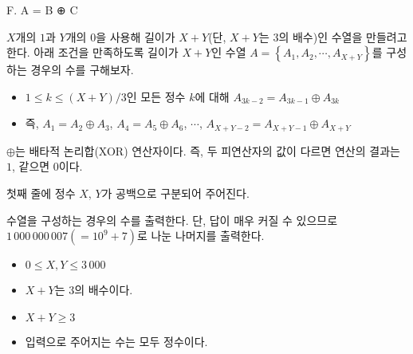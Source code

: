 \def\probtitle{A = B ⊕ C}
\def\probno{F} %

\begin{problem}{\probno{}. \probtitle{}}

$X$개의 $1$과 $Y$개의 $0$을 사용해 길이가 $X+Y$(단, $X+Y$는 3의 배수)인 수열을 만들려고 한다. 아래 조건을 만족하도록 길이가 $X+Y$인 수열 $A = \left\{A_1, A_2, \cdots, A_{X+Y}\right\}$를 구성하는 경우의 수를 구해보자.

\begin{itemize}[topsep=0pt,noitemsep]
    \item $1 \le k \le (X+Y)/3$인 모든 정수 $k$에 대해 $A_{3k-2} = A_{3k-1} \oplus A_{3k}$
    \item 즉, $A_1 = A_2 \oplus A_3$, $A_4 = A_5 \oplus A_6$, $\cdots$, $A_{X+Y-2} = A_{X+Y-1} \oplus A_{X+Y}$
\end{itemize}

$\oplus$는 배타적 논리합(XOR) 연산자이다. 즉, 두 피연산자의 값이 다르면 연산의 결과는 $1$, 같으면 $0$이다.

\InputFile
첫째 줄에 정수 $X$, $Y$가 공백으로 구분되어 주어진다.

\OutputFile
수열을 구성하는 경우의 수를 출력한다. 단, 답이 매우 커질 수 있으므로 $1\,000\,000\,007(= 10^9+7)$로 나눈 나머지를 출력한다.

\Constraints

\begin{itemize}[topsep=0pt,noitemsep]
    \item $0 \le X,Y \le 3\,000$
    \item $X+Y$는 3의 배수이다.
    \item $X+Y \ge 3$
    \item 입력으로 주어지는 수는 모두 정수이다.
\end{itemize}

\Examples

\begin{example}
%
%
%
\end{example}

\end{problem}